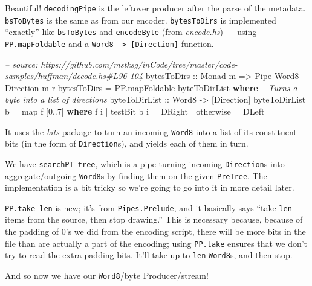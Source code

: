 \documentclass[]{article}
\newenvironment{Shaded}{\begin{snugshade}}{\end{snugshade}}
\newcommand{\CommentTok}[1]{\textcolor[rgb]{0.56,0.35,0.01}{\textit{#1}}}
\newcommand{\DataTypeTok}[1]{\textcolor[rgb]{0.13,0.29,0.53}{#1}}
\newcommand{\DecValTok}[1]{\textcolor[rgb]{0.00,0.00,0.81}{#1}}
\newcommand{\FunctionTok}[1]{\textcolor[rgb]{0.00,0.00,0.00}{#1}}
\newcommand{\KeywordTok}[1]{\textcolor[rgb]{0.13,0.29,0.53}{\textbf{#1}}}
\newcommand{\NormalTok}[1]{#1}
\newcommand{\OtherTok}[1]{\textcolor[rgb]{0.56,0.35,0.01}{#1}}
\begin{document}
Beautiful! \texttt{decodingPipe} is the leftover producer after the parse of the
metadata. \texttt{bsToBytes} is the same as from our encoder.
\texttt{bytesToDirs} is implemented ``exactly'' like \texttt{bsToBytes} and
\texttt{encodeByte} (from \emph{encode.hs}) --- using \texttt{PP.mapFoldable}
and a \texttt{Word8\ -\textgreater{}\ {[}Direction{]}} function.

\begin{Shaded}
\begin{Highlighting}[]
\CommentTok{-- source: https://github.com/mstksg/inCode/tree/master/code-samples/huffman/decode.hs#L96-104}
\OtherTok{bytesToDirs ::} \DataTypeTok{Monad}\NormalTok{ m }\OtherTok{=>} \DataTypeTok{Pipe} \DataTypeTok{Word8} \DataTypeTok{Direction}\NormalTok{ m r}
\NormalTok{bytesToDirs }\FunctionTok{=}\NormalTok{ PP.mapFoldable byteToDirList}
  \KeywordTok{where}
    \CommentTok{-- Turns a byte into a list of directions}
\OtherTok{    byteToDirList ::} \DataTypeTok{Word8} \OtherTok{->}\NormalTok{ [}\DataTypeTok{Direction}\NormalTok{]}
\NormalTok{    byteToDirList b }\FunctionTok{=}\NormalTok{ map f [}\DecValTok{0}\FunctionTok{..}\DecValTok{7}\NormalTok{]}
      \KeywordTok{where}
\NormalTok{        f i }\FunctionTok{|}\NormalTok{ testBit b i }\FunctionTok{=} \DataTypeTok{DRight}
            \FunctionTok{|}\NormalTok{ otherwise   }\FunctionTok{=} \DataTypeTok{DLeft}
\end{Highlighting}
\end{Shaded}

It uses the \emph{bits} package to turn an incoming \texttt{Word8} into a list
of its constituent bits (in the form of \texttt{Direction}s), and yields each of
them in turn.

We have \texttt{searchPT\ tree}, which is a pipe turning incoming
\texttt{Direction}s into aggregate/outgoing \texttt{Word8}s by finding them on
the given \texttt{PreTree}. The implementation is a bit tricky so we're going to
go into it in more detail later.

\texttt{PP.take\ len} is new; it's from \texttt{Pipes.Prelude}, and it basically
says ``take \texttt{len} items from the source, then stop drawing.'' This is
necessary because, because of the padding of 0's we did from the encoding
script, there will be more bits in the file than are actually a part of the
encoding; using \texttt{PP.take} ensures that we don't try to read the extra
padding bits. It'll take up to \texttt{len} \texttt{Word8}s, and then stop.

And so now we have our \texttt{Word8}/byte Producer/stream!
\end{document}
